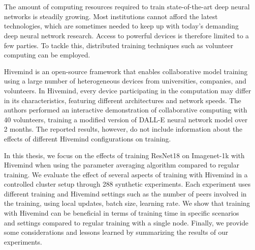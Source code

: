 \chapter{\abstractname}

The amount of computing resources required to train state-of-the-art deep neural networks is steadily growing.
Most institutions cannot afford the latest technologies, which are sometimes needed to keep up with today's demanding deep neural network research.
Access to powerful devices is therefore limited to a few parties.
To tackle this, distributed training techniques such as volunteer computing can be employed.

Hivemind \cite{hivemind} is an open-source framework that enables collaborative model training using a large number of heterogeneous devices from universities, companies, and volunteers.
In Hivemind, every device participating in the computation may differ in its characteristics, featuring different architectures and network speeds.
The authors performed an interactive demonstration of collaborative computing with 40 volunteers, training a modified version of DALL-E \cite{ramesh2021zero} neural network model over 2 months.
The reported results, however, do not include information about the effects of different Hivemind configurations on training.

In this thesis, we focus on the effects of training ResNet18 \cite{he2015deep} on Imagenet-1k \cite{deng2009imagenet} with Hivemind when using the parameter averaging algorithm \cite{DBLP:journals/corr/abs-2106-10207} compared to regular training.
We evaluate the effect of several aspects of training with Hivemind in a controlled cluster setup through 288 synthetic experiments.
Each experiment uses different training and Hivemind settings such as the number of peers involved in the training, using local updates, batch size, learning rate.
We show that training with Hivemind can be beneficial in terms of training time in specific scenarios and settings compared to regular training with a single node.
Finally, we provide some considerations and lessons learned by summarizing the results of our experiments.

